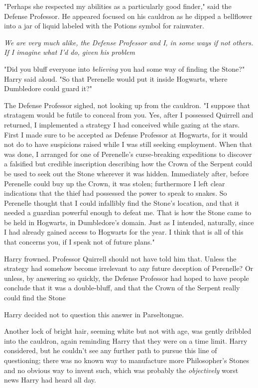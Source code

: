 "Perhaps she respected my abilities as a particularly good finder," said the
Defense Professor. He appeared focused on his cauldron as he dipped a
bellflower into a jar of liquid labeled with the Potions symbol for rainwater.

\emph{We are very much alike, the Defense Professor and I, in some ways if not
others. If I imagine what I'd do, given his problem{\el}}

"Did you bluff everyone into \emph{believing} you had some way of finding the
Stone?" Harry said aloud. "So that Perenelle would put it inside Hogwarts,
where Dumbledore could guard it?"

The Defense Professor sighed, not looking up from the cauldron. "I suppose that
stratagem would be futile to conceal from you. Yes, after I possessed Quirrell
and returned, I implemented a strategy I had conceived while gazing at the
stars. First I made sure to be accepted as Defense Professor at Hogwarts, for
it would not do to have suspicions raised while I was still seeking employment.
When that was done, I arranged for one of Perenelle's curse-breaking
expeditions to discover a falsified but credible inscription describing how the
Crown of the Serpent could be used to seek out the Stone wherever it was
hidden. Immediately after, before Perenelle could buy up the Crown, it was
stolen; furthermore I left clear indications that the thief had possessed the
power to speak to snakes. So Perenelle thought that I could infallibly find the
Stone's location, and that it needed a guardian powerful enough to defeat me.
That is how the Stone came to be held in Hogwarts, in Dumbledore's domain. Just
as I intended, naturally, since I had already gained access to Hogwarts for the
year. I think that is all of this that concerns you, if I speak not of future
plans."

Harry frowned. Professor Quirrell should not have told him that. Unless the
strategy had somehow become irrelevant to any future deception of
Perenelle\el? Or unless, by answering so quickly, the Defense Professor
had hoped to have people conclude that it was a double-bluff, and that the
Crown of the Serpent really could find the Stone{\el}

Harry decided not to question this answer in Parseltongue.

Another lock of bright hair, seeming white but not with age, was gently
dribbled into the cauldron, again reminding Harry that they were on a time
limit. Harry considered, but he couldn't see any further path to pursue this
line of questioning; there was no known way to manufacture more Philosopher's
Stones and no obvious way to invent such, which was probably the
\emph{objectively} worst news Harry had heard all day.

